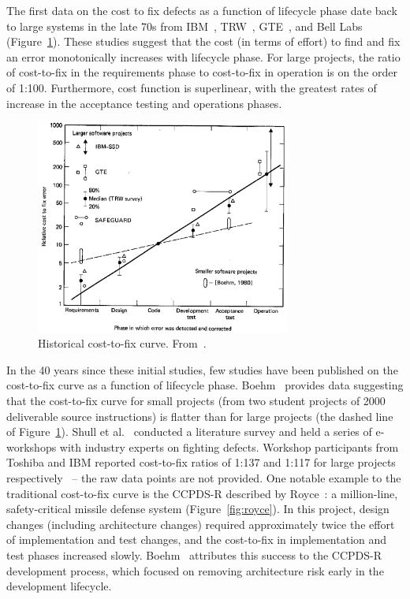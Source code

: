 The first data on the cost to fix defects as a function of lifecycle phase date back to large systems in the late 70s from IBM~\cite{Fagan76}, TRW~\cite{Boehm76}, GTE~\cite{Daly77}, and Bell Labs~\cite{Stephenson76} (Figure~\ref{fig:cost-to-fix}). These studies suggest that the cost (in terms of effort) to find and fix an error monotonically increases with lifecycle phase. For large projects, the ratio of cost-to-fix in the requirements phase to cost-to-fix in operation is on the order of 1:100. Furthermore, cost function is superlinear, with the greatest rates of increase in the acceptance testing and operations phases.

\begin{figure}[!ht]
 \includegraphics[width=3.3in]{boehm_cost-to-fix.png}
 \caption{Historical cost-to-fix curve. From~\cite{Boehm81}.}\label{fig:cost-to-fix}
 \end{figure}
 
In the 40 years since these initial studies, few studies have been published on the cost-to-fix curve as a function of lifecycle phase. Boehm~\cite{Boehm80} provides data suggesting that the cost-to-fix curve for small projects (from two student projects of 2000 deliverable source instructions) is flatter than for large projects (the dashed line of Figure~\ref{fig:cost-to-fix}). Shull et al.~\cite{Shull02} conducted a literature survey and held a series of e-workshops with industry experts on fighting defects. Workshop participants from Toshiba and IBM reported cost-to-fix ratios of 1:137 and 1:117 for large projects respectively~\cite{Shull02} -- the raw data points are not provided. One notable example to the traditional cost-to-fix curve is the CCPDS-R described by Royce~\cite{Royce98}: a million-line, safety-critical missile defense system (Figure~\ref{fig:royce}). In this project, design changes (including architecture changes) required approximately twice the effort of implementation and test changes, and the cost-to-fix in implementation and test phases increased slowly. Boehm~\cite{Boehm10} attributes this success to the CCPDS-R development process, which focused on removing architecture risk early in the development lifecycle.

